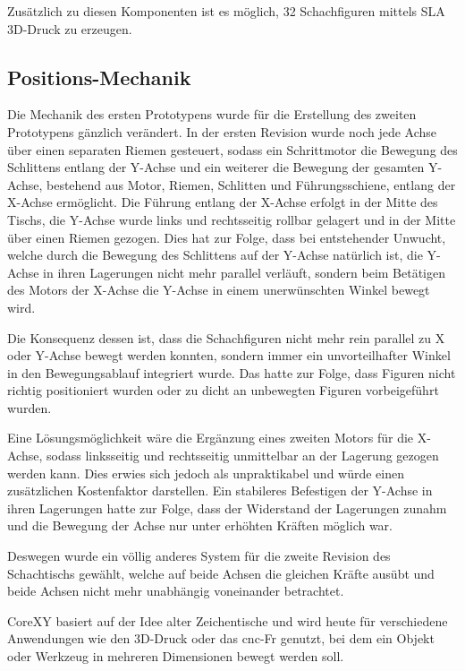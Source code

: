 Zusätzlich zu diesen Komponenten ist es möglich, 32 Schachfiguren
mittels SLA 3D-Druck zu erzeugen.

\hypertarget{positions-mechanik}{%
\subsection{Positions-Mechanik}\label{positions-mechanik}}

Die Mechanik des ersten Prototypens wurde für die Erstellung des zweiten
Prototypens gänzlich verändert. In der ersten Revision wurde noch jede
Achse über einen separaten Riemen gesteuert, sodass ein Schrittmotor die
Bewegung des Schlittens entlang der Y-Achse und ein weiterer die
Bewegung der gesamten Y-Achse, bestehend aus Motor, Riemen, Schlitten
und Führungsschiene, entlang der X-Achse ermöglicht. Die Führung entlang
der X-Achse erfolgt in der Mitte des Tischs, die Y-Achse wurde links und
rechtsseitig rollbar gelagert und in der Mitte über einen Riemen
gezogen. Dies hat zur Folge, dass bei entstehender Unwucht, welche durch
die Bewegung des Schlittens auf der Y-Achse natürlich ist, die Y-Achse
in ihren Lagerungen nicht mehr parallel verläuft, sondern beim Betätigen
des Motors der X-Achse die Y-Achse in einem unerwünschten Winkel bewegt
wird.

Die Konsequenz dessen ist, dass die Schachfiguren nicht mehr rein
parallel zu X oder Y-Achse bewegt werden konnten, sondern immer ein
unvorteilhafter Winkel in den Bewegungsablauf integriert wurde. Das
hatte zur Folge, dass Figuren nicht richtig positioniert wurden oder zu
dicht an unbewegten Figuren vorbeigeführt wurden.

Eine Lösungsmöglichkeit wäre die Ergänzung eines zweiten Motors für die
X-Achse, sodass linksseitig und rechtsseitig unmittelbar an der Lagerung
gezogen werden kann. Dies erwies sich jedoch als unpraktikabel und würde
einen zusätzlichen Kostenfaktor darstellen. Ein stabileres Befestigen
der Y-Achse in ihren Lagerungen hatte zur Folge, dass der Widerstand der
Lagerungen zunahm und die Bewegung der Achse nur unter erhöhten Kräften
möglich war.

Deswegen wurde ein völlig anderes System für die zweite Revision des
Schachtischs gewählt, welche auf beide Achsen die gleichen Kräfte ausübt
und beide Achsen nicht mehr unabhängig voneinander betrachtet.

CoreXY basiert auf der Idee alter Zeichentische und wird heute für
verschiedene Anwendungen wie den 3D-Druck oder das \gls{cnc}-Fr genutzt,
bei dem ein Objekt oder Werkzeug in mehreren Dimensionen bewegt werden
soll.

